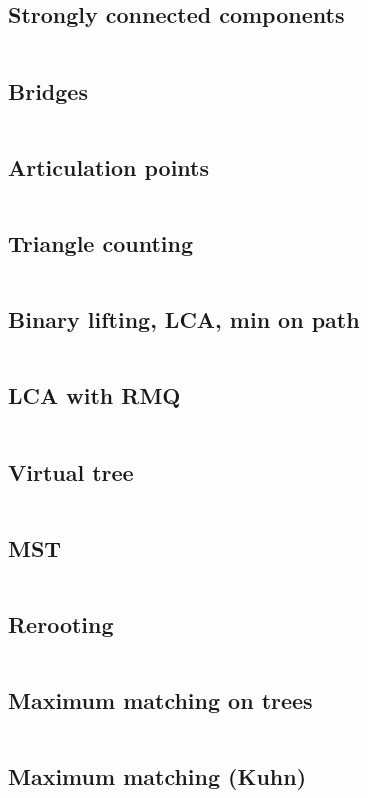 ﻿\documentclass[a4paper,10pt,twocolumn,oneside]{article}
\begin{document}
\subsection{Strongly connected components}
\inputminted[breaklines]{cpp}{Graph algorithms/strongly connected components.cpp}
\subsection{Bridges}
\inputminted[breaklines]{cpp}{Graph algorithms/bridges.cpp}
\subsection{Articulation points}
\inputminted[breaklines]{cpp}{Graph algorithms/articulation points.cpp}
\subsection{Triangle counting}
\inputminted[breaklines]{cpp}{Graph algorithms/triangles.cpp}
\subsection{Binary lifting, LCA, min on path}
\inputminted[breaklines]{cpp}{Graph algorithms/binary lifting + lca + min on path.cpp}
\subsection{LCA with RMQ}
\inputminted[breaklines]{cpp}{Graph algorithms/lca with rmq.cpp}
\subsection{Virtual tree}
\inputminted[breaklines]{cpp}{Graph algorithms/virtual tree.cpp}
\subsection{MST}
\inputminted[breaklines]{cpp}{Graph algorithms/mst.cpp}
\subsection{Rerooting}
\inputminted[breaklines]{cpp}{Graph algorithms/rerooting.cpp}
\subsection{Maximum matching on trees}
\inputminted[breaklines]{cpp}{Graph algorithms/maximum matching on trees.cpp}
\subsection{Maximum matching (Kuhn)}
\inputminted[breaklines]{cpp}{Graph algorithms/kuhn (with optimizations).cpp}
\end{document}

